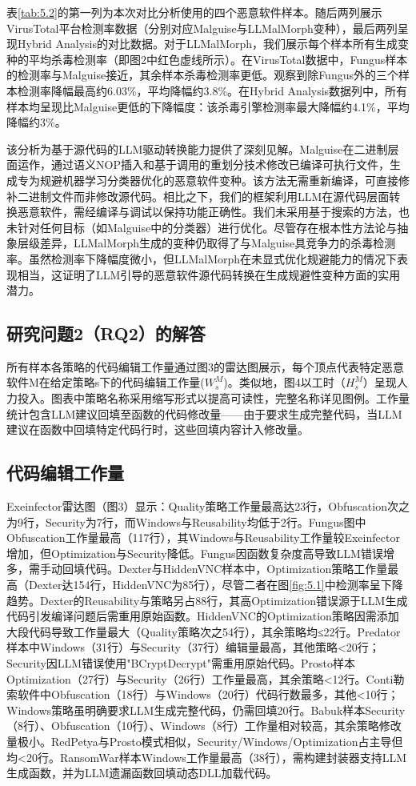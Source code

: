表\ref{tab:5.2}的第一列为本次对比分析使用的四个恶意软件样本。随后两列展示VirusTotal平台检测率数据（分别对应Malguise与LLMalMorph变种），最后两列呈现Hybrid Analysis的对比数据。对于LLMalMorph，我们展示每个样本所有生成变种的平均杀毒检测率（即图2中红色虚线所示）。在VirusTotal数据中，Fungus样本的检测率与Malguise接近，其余样本杀毒检测率更低。观察到除Fungus外的三个样本检测率降幅最高约6.03\%，平均降幅约3.8\%。在Hybrid Analysis数据列中，所有样本均呈现比Malguise更低的下降幅度：该杀毒引擎检测率最大降幅约4.1\%，平均降幅约3\%。

该分析为基于源代码的LLM驱动转换能力提供了深刻见解。Malguise在二进制层面运作，通过语义NOP插入和基于调用的重划分技术修改已编译可执行文件，生成专为规避机器学习分类器优化的恶意软件变种。该方法无需重新编译，可直接修补二进制文件而非修改源代码。相比之下，我们的框架利用LLM在源代码层面转换恶意软件，需经编译与调试以保持功能正确性。我们未采用基于搜索的方法，也未针对任何目标（如Malguise中的分类器）进行优化。尽管存在根本性方法论与抽象层级差异，LLMalMorph生成的变种仍取得了与Malguise具竞争力的杀毒检测率。虽然检测率下降幅度微小，但LLMalMorph在未显式优化规避能力的情况下表现相当，这证明了LLM引导的恶意软件源代码转换在生成规避性变种方面的实用潜力。

\subsection{研究问题2（RQ2）的解答}
所有样本各策略的代码编辑工作量通过图3的雷达图展示，每个顶点代表特定恶意软件M在给定策略s下的代码编辑工作量($W_{s}^{M}$)。类似地，图4以工时（$H_{s}^{M}$）呈现人力投入。图表中策略名称采用缩写形式以提高可读性，完整名称详见图例。工作量统计包含LLM建议回填至函数的代码修改量——由于要求生成完整代码，当LLM建议在函数中回填特定代码行时，这些回填内容计入修改量。

\subsection{代码编辑工作量}
Exeinfector雷达图（图3）显示：Quality策略工作量最高达23行，Obfuscation次之为9行，Security为7行，而Windows与Reusability均低于2行。Fungus图中Obfuscation工作量最高（117行），其Windows与Reusability工作量较Exeinfector增加，但Optimization与Security降低。Fungus因函数复杂度高导致LLM错误增多，需手动回填代码。Dexter与HiddenVNC样本中，Optimization策略工作量最高（Dexter达154行，HiddenVNC为85行），尽管二者在图\ref{fig:5.1}中检测率呈下降趋势。Dexter的Reusability与策略另占88行，其高Optimization错误源于LLM生成代码引发编译问题后需重用原始函数。HiddenVNC的Optimization策略因需添加大段代码导致工作量最大（Quality策略次之54行），其余策略均≤22行。Predator样本中Windows（31行）与Security（37行）编辑量最高，其他策略<20行；Security因LLM错误使用"BCryptDecrypt"需重用原始代码。Prosto样本Optimization（27行）与Security（26行）工作量最高，其余策略<12行。Conti勒索软件中Obfuscation（18行）与Windows（20行）代码行数最多，其他<10行；Windows策略虽明确要求LLM生成完整代码，仍需回填20行。Babuk样本Security（8行）、Obfuscation（10行）、Windows（8行）工作量相对较高，其余策略修改量极小。RedPetya与Prosto模式相似，Security/Windows/Optimization占主导但均<20行。RansomWar样本Windows工作量最高（38行），需构建封装器支持LLM生成函数，并为LLM遗漏函数回填动态DLL加载代码。

